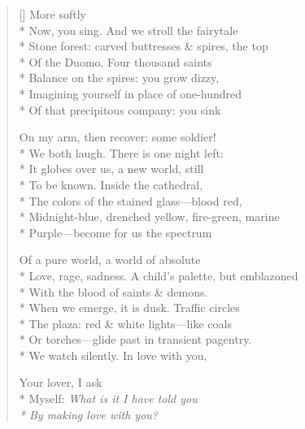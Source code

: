 \label{ch:milano_lover}
\settowidth{\versewidth}{Love, rage, sadness. A child's palette, but emblazoned}
\begin{verse}[\versewidth]
\hspace*{2\vgap} More softly\\*
Now, you sing.   And we stroll the fairytale\\*
Stone forest: carved buttresses \& spires, the top\\*
Of the Duomo.    Four thousand saints\\*
Balance on the spires: you grow dizzy,\\*
Imagining yourself in place of one-hundred\\*
Of that precipitous company: you sink

On my arm, then recover: some soldier!\\*
We both laugh.   There is one night left:\\*
It globes over us, a new world, still\\*
To be known.   Inside the cathedral,\\*
The colors of the stained glass---blood red,\\*
Midnight-blue, drenched yellow, fire-green, marine\\*
Purple---become for us the spectrum

Of a pure world, a world of absolute\\*
Love, rage, sadness. A child's palette, but emblazoned\\*
With the blood of saints \& demons.\\*
When we emerge, it is dusk.   Traffic circles\\*
The plaza: red \& white lights---like coals\\*
Or torches---glide past in transient pagentry.\\*
We watch silently.    In love with you,

Your lover, I ask\\*
Myself: \textit{What is it I have told you\\*
By making love with you?}
\end{verse}
